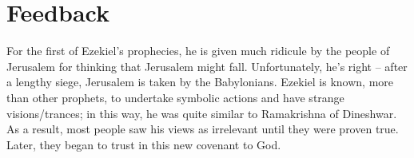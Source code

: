 \documentclass[a4paper]{article}
\begin{document}
\section{Feedback}%
\label{sec:Feedback}
For the first of Ezekiel's prophecies, he is given much ridicule by the people of Jerusalem for thinking that Jerusalem might fall. Unfortunately, he's right -- after a lengthy siege, Jerusalem is taken by the Babylonians. Ezekiel is known, more than other prophets, to undertake symbolic actions and have strange visions/trances; in this way, he was quite similar to Ramakrishna of Dineshwar. As a result, most people saw his views as irrelevant until they were proven true. Later, they began to trust in this new covenant to God. 
\end{document}

